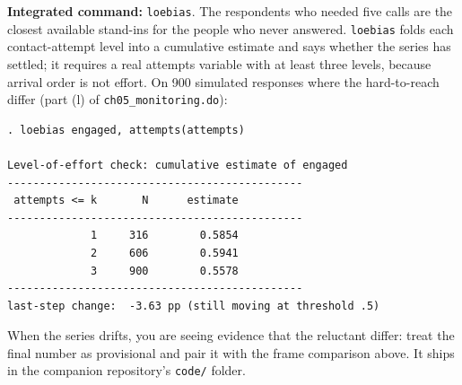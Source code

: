 \begin{kaobox}[frametitle=Package Integration: \texttt{loebias}]
\textbf{Integrated command:} \texttt{loebias}. The respondents who needed five calls are the closest available stand-ins for the people who never answered. \texttt{loebias} folds each contact-attempt level into a cumulative estimate and says whether the series has settled; it requires a real attempts variable with at least three levels, because arrival order is not effort. On 900 simulated responses where the hard-to-reach differ (part (l) of \texttt{ch05\_monitoring.do}):
\par
{\footnotesize
\begin{verbatim}
. loebias engaged, attempts(attempts)

Level-of-effort check: cumulative estimate of engaged
----------------------------------------------
 attempts <= k       N      estimate
----------------------------------------------
             1     316        0.5854
             2     606        0.5941
             3     900        0.5578
----------------------------------------------
last-step change:  -3.63 pp (still moving at threshold .5)
\end{verbatim}
}
When the series drifts, you are seeing evidence that the reluctant differ: treat the final number as provisional and pair it with the frame comparison above. It ships in the companion repository's \texttt{code/} folder.
\end{kaobox}

